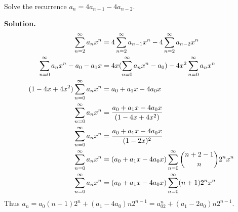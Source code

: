 \documentclass{book}
\begin{document}
\setcounter{project}{270}
\addtocounter{project}{-1}
\begin{activity}[]\label{activity-263}
\hypertarget{p-1410}{}%
Solve the recurrence \(a_n= 4a_{n-1} - 4a_{n-2}\).%
\par\smallskip%
\noindent\textbf{Solution.}\hypertarget{solution-186}{}\quad%
\hypertarget{p-1411}{}%
%
\begin{align*}
\sum_{n=2}^\infty a_nx^n  &=  4\sum_{n=2}^\infty a_{n-1}x^n -
4\sum_{n=2}^\infty a_{n-2}x^n\\
\sum_{n=0}^\infty a_nx^n -a_0-a_1x  &=  4x(\sum_{n=0}^\infty a_{n}x^n
-a_0) - 4x^2\sum_{n=0}^\infty a_{n}x^n\\
(1-4x+4x^2)\sum_{n=0}^\infty a_nx^n   &=
a_0+a_1x-4a_0x\\
\sum_{n=0}^\infty a_nx^n &= \frac{a_0+a_1x-4a_0x}{(1-4x+4x^2)}\\
\sum_{n=0}^\infty a_nx^n &= \frac{a_0+a_1x-4a_0x}{(1-2x)^2}\\
\sum_{n=0}^\infty a_nx^n &= (a_0+a_1x-4a_0x)\sum_{n=0}^\infty \binom{n+2-1}{n}
2^nx^n\\
\sum_{n=0}^\infty a_nx^n &= (a_0+a_1x-4a_0x)\sum_{n=0}^\infty (n+1)
2^nx^n
\end{align*}
Thus \(a_n=a_0(n+1)2^n
+(a_1-4a_0)n2^{n-1}=a_02^n+(a_1-2a_0)n2^{n-1}\).%
\end{activity}
\end{document}
